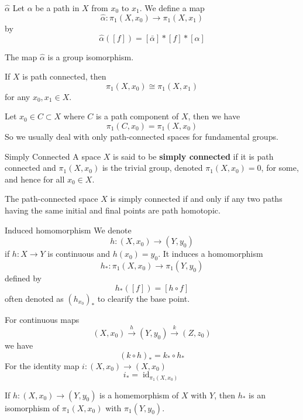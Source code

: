 \documentclass[12pt,a4paper]{article}
\begin{document}
    \begin{defi}{$\hat{\alpha}$}
        Let $\alpha$ be a path in $X$ from $x_0$ to $x_1$. We define a map
        \[
            \hat{\alpha}:\pi_1(X,x_0)\to\pi_1(X,x_1)
        \]
        by
        \[
            \hat{\alpha}([f])=[\bar{\alpha}]*[f]*[\alpha]
        \]
    \end{defi}
    \bigskip

    \begin{thm}\label{1.2.4}
        The map $\hat{\alpha}$ is a group isomorphism.
    \end{thm}
    \begin{cor}
        If $X$ is path connected, then
        \[
            \pi_1(X,x_0)\cong\pi_1(X,x_1)
        \]
        for any $x_0,x_1\in X$.
    \end{cor}
    \begin{remark}
        Let $x_0\in C\subset X$ where $C$ is a path component of $X$, then we have
        \[
            \pi_1(C,x_0)=\pi_1(X,x_0)
        \]
        So we usually deal with only path-connected spaces for fundamental groups.
    \end{remark}
    \bigskip

    \begin{defi}{Simply Connected}
        A space $X$ is said to be \textbf{simply connected} if it is path connected and $\pi_1(X,x_0)$ is the trivial group, denoted $\pi_1(X,x_0)=0$, for some, and hence for all $x_0\in X$.
    \end{defi}
    \begin{lemma}\label{1.2.7}
        The path-connected space $X$ is simply connected if and only if any two paths having the same initial and final points are path homotopic.
    \end{lemma}
    \bigskip

    \begin{defi}{Induced homomorphism}
        We denote
        \[
            h:(X,x_0)\to (Y,y_0)
        \]
        if $h:X\to Y$ is continuous and $h(x_0)=y_0$. It induces a homomorphism
        \[
            h_*:\pi_1(X,x_0)\to\pi_1(Y,y_0)
        \]
        defined by
        \[
            h_*([f])=[h\circ f]
        \]
        often denoted as $(h_{x_0})_*$ to clearify the base point.
    \end{defi}
    \bigskip

    \begin{thm}
        For continuous maps
        \[
            (X,x_0)\xrightarrow{h}(Y,y_0)\xrightarrow{k}(Z,z_0)
        \]
        we have
        \[
            (k\circ h)_*=k_*\circ h_*
        \]
        For the identity map \(i:(X,x_0)\to(X,x_0)\)
        \[
            i_*=\operatorname{id}_{\pi_1(X,x_0)}
        \]
    \end{thm}
    \begin{cor}
        If $h:(X,x_0)\to (Y,y_0)$ is a homemorphism of $X$ with $Y$, then $h_*$ is an isomorphism of $\pi_1(X,x_0)$ with $\pi_1(Y,y_0)$.
    \end{cor}
    \bigskip
\end{document}
